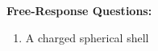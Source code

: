 \documentclass[12pt]{article}
\begin{document}
\begin{enumerate}[leftmargin=50pt,label=\underline{\hspace{0.4in}} \arabic*.]
%
\end{enumerate}

\newpage
\noindent\textbf{Free-Response Questions:}

\begin{enumerate}[leftmargin=15pt]

\item A charged spherical shell
%
%
%  
\end{enumerate}
\end{document}
